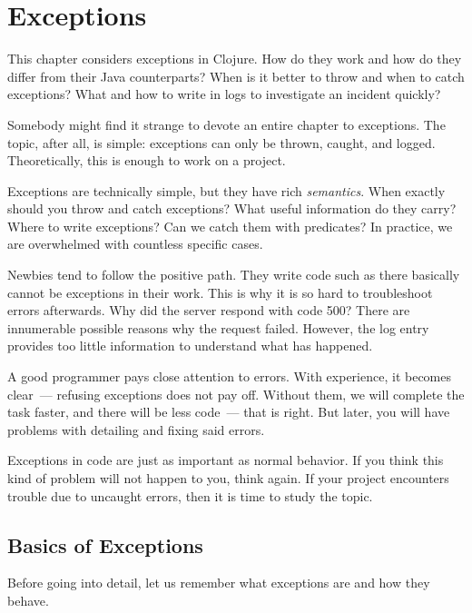 \chapter{Exceptions}


\begin{teaser}
This chapter considers exceptions in Clojure. How do they work and how do they differ from their Java counterparts? When is it better to throw and when to catch exceptions? What and how to write in logs to investigate an incident quickly?
\end{teaser}

Somebody might find it strange to devote an entire chapter to exceptions. The topic, after all, is simple: exceptions can only be thrown, caught, and logged. Theoretically, this is enough to work on a project.

Exceptions are technically simple, but they have rich \emph{semantics}. When exactly should you throw and catch exceptions? What useful information do they carry? Where to write exceptions? Can we catch them with predicates? In practice, we are overwhelmed with countless specific cases.

Newbies tend to follow the positive path. They write code such as there basically cannot be exceptions in their work. This is why it is so hard to troubleshoot errors afterwards. Why did the server respond with code 500? There are innumerable possible reasons why the request failed. However, the log entry provides too little information to understand what has happened.

A good programmer pays close attention to errors. With experience, it becomes clear~--- refusing exceptions does not pay off. Without them, we will complete the task faster, and there will be less code~--- that is right. But later, you will have problems with detailing and fixing said errors.

Exceptions in code are just as important as normal behavior. If you think this kind of problem will not happen to you, think again. If your project encounters trouble due to uncaught errors, then it is time to study the topic.

\section{Basics of Exceptions}


Before going into detail, let us remember what exceptions are and how they behave.

